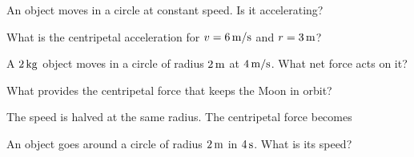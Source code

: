 \begin{exo}{}
An object moves in a circle at constant speed. Is it accelerating?
\end{exo}
\begin{exo}{}
What is the centripetal acceleration for $v=6\,\mathrm{m/s}$ and $r=3\,\mathrm{m}$?
\choices{$2\mss$}{$18\mss$}{$12\mss$}{$6\mss$}
\end{exo}
\begin{exo}{}
A $2\,\mathrm{kg}$ object moves in a circle of radius $2\,\mathrm{m}$ at $4\,\mathrm{m/s}$. What net force acts on it?
\choices{$16\N$}{$8\N$}{$4\N$}{$32\N$}
\end{exo}
\begin{exo}{}
What provides the centripetal force that keeps the Moon in orbit?
\end{exo}
\begin{exo}{}
The speed is halved at the same radius. The centripetal force becomes
\end{exo}
\begin{exo}{}
An object goes around a circle of radius $2\,\mathrm{m}$ in $4\,\mathrm{s}$. What is its speed?
\end{exo}

